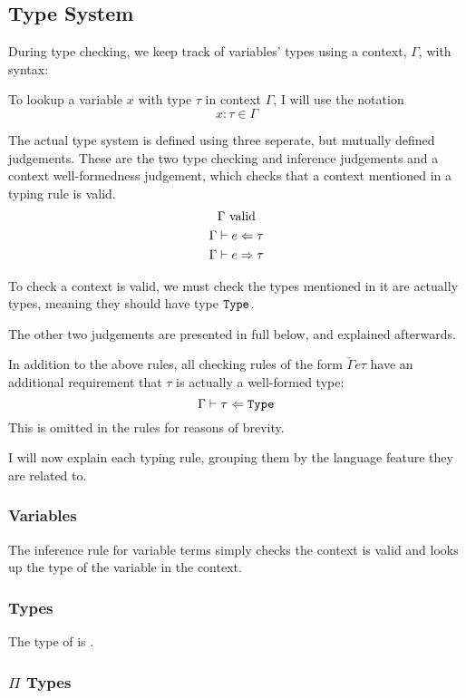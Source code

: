 \documentclass[12pt,a4paper,twoside]{report}
\begin{document}
\subsection{Type System}

During type checking, we keep track of variables' types using a context, \(\Gamma\), with syntax:
\ctxsyntax{}

To lookup a variable \(x\) with type \(\tau\) in context \(\Gamma\), I will use the notation
\[
    x : \tau \in \Gamma
\]

The actual type system is defined using three seperate, but mutually defined judgements.
These are the two type checking and inference judgements and a context well-formedness judgement, which checks that a context mentioned in a typing rule is valid.
\begin{gather*}
    \Gamma\ \text{valid} \\
    \Gamma \vdash e \Leftarrow \tau \\
    \Gamma \vdash e \Rightarrow \tau
\end{gather*}

To check a context is valid, we must check the types mentioned in it are actually types, meaning they should have type \(\mathtt{Type}\).
\ctxvalidity

The other two judgements are presented in full below, and explained afterwards.

In addition to the above rules, all checking rules of the form \(\check{\Gamma}{e}{\tau}\) have an additional requirement that \(\tau\) is actually a well-formed type:
\[
    \Gamma \vdash \tau \Leftarrow \mathtt{Type}
\]
This is omitted in the rules for reasons of brevity.

I will now explain each typing rule, grouping them by the language feature they are related to.

\subsubsection{Variables}

The inference rule for variable terms simply checks the context is valid and looks up the type of the variable in the context.

\subsubsection{Types}

The type of \type{} is \type{}.

\subsubsection{\(\Pi\) Types}
\end{document}
